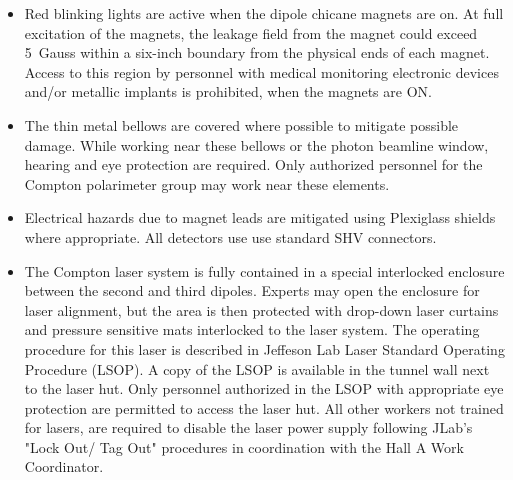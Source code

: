 \begin{safetyen}{0}{0}
\begin{itemize}
\item{Red blinking lights are active when the dipole chicane magnets are on. At full excitation of the magnets, the leakage field from the magnet could exceed 5~Gauss within a six-inch boundary from the physical ends of each magnet. Access to this region by personnel with  medical monitoring electronic devices and/or metallic implants is prohibited, when the magnets are ON.}
\item{The thin metal bellows are covered where possible to mitigate possible damage. While working near these bellows or the photon beamline window, hearing and eye protection are required. Only authorized personnel for the Compton polarimeter group may  work near these elements.}
\item{Electrical hazards due to magnet leads are mitigated using Plexiglass shields where appropriate.  All detectors use use standard SHV connectors.}
\item{The Compton laser system is fully contained in a special interlocked enclosure between the second and third dipoles.  Experts may open the enclosure for laser alignment, but the area is then protected with drop-down laser curtains and pressure sensitive mats interlocked to the laser system.  The operating procedure for this laser is described in 
Jeffeson Lab Laser Standard Operating Procedure \cite{compton_LSOP} (LSOP). A copy of the LSOP is available in the tunnel wall next to the laser hut. Only personnel authorized in the LSOP with appropriate eye protection are permitted to access the laser hut. All other workers not trained for lasers, are required to disable the laser power supply following JLab's "Lock Out/ Tag Out" procedures in coordination with the Hall A Work Coordinator.}
\end{itemize}

%


\end{safetyen}
